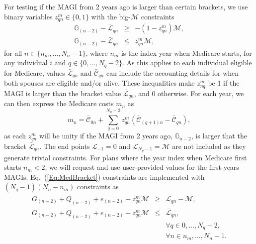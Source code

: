 \documentclass{report}[fleqn,11pt]
\begin{document}
        For testing if the MAGI from 2 years ago is larger than certain brackets,
	we use binary variables $z_{qn}^m \in \{0, 1\}$ with the big-$\mathcal{M}$ constraints
	\begin{eqnarray}
		\label{Eq:MedBracket}
                \mathbb{G}_{(n-2)} - \bar{\mathcal{L}}_{qn} & \geq & -(1 - z_{qn}^m) \mathcal{M}, \nonumber\\
                \mathbb{G}_{(n-2)} - \bar{\mathcal{L}}_{qn} & \leq & z_{qn}^m \mathcal{M},
	\end{eqnarray}
	for all $n \in \{n_m, \ldots, N_n-1\}$, where $n_{m}$ is the index year when
	Medicare starts, for any individual $i$ and $q \in \{0, \ldots, N_q -2\}$.
        As this applies to each individual eligible for Medicare, values
	$\bar{\mathcal{L}}_{qn}$ and  $\bar{\mathcal{C}}_{qn}$
	can include the accounting details for when both spouses are eligible and/or alive.
        These inequalities make $z_{nq}^m$ be 1 if
        the MAGI is larger than the bracket value $\bar{\mathcal{L}}_{qn}$, and 0 otherwise.
        For each year, we can then express the Medicare costs $m_n$ as
	\begin{equation}
		\label{Eq:MediCosts}
		m_n = \bar{\mathcal{C}}_{0n}
                + \sum_{q=0}^{N_q -2} z_{qn}^m (\bar{\mathcal{C}}_{(q+1)n} - \bar{\mathcal{C}}_{qn}),
	\end{equation}
	as each $z_{qn}^m$ will be unity if the MAGI from 2 years ago, $\mathbb{G}_{n-2}$,
        is larger that the bracket $\bar{\mathcal{L}}_{qn}$.
	The end points $\mathcal{L}_{-1} = 0$ and $\mathcal{L}_{N_q-1} = \mathcal{M}$ are not included
        as they generate trivial constraints.
	For plans where the year index when Medicare first starts $n_m<2$, we will request
	and use user-provided values for the first-years MAGIs.
	Eq.~(\ref{Eq:MedBracket}) constraints are implemented
	with $(N_q -1)(N_n - n_m)$ constraints as
	\begin{eqnarray}
		\label{Eq:MedBracket2}
		G_{(n-2)} + Q_{(n-2)} + e_{(n-2)} - z_{qn}^m \mathcal{M}
                & \geq & \bar{\mathcal{L}}_{qn} - \mathcal{M}, \nonumber\\
		G_{(n-2)} + Q_{(n-2)} + e_{(n-2)} - z_{qn}^m \mathcal{M}
                & \leq & \bar{\mathcal{L}}_{qn}, \nonumber\\
		&&\forall q \in {0, \ldots, N_q-2},\nonumber \\
		&&\forall n \in {n_m, \ldots, N_n-1}.
	\end{eqnarray}
\end{document}

